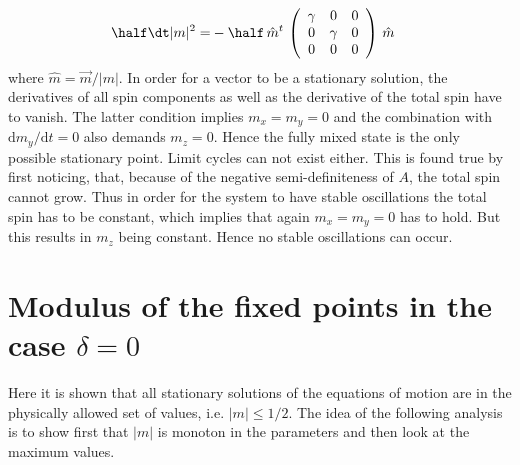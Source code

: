 \begin{appendices}
\begin{align*}
        \half\dt |m|^2=&-\half\,\hat{m}^t\,\left( \begin{array}{ccc}
            \gamma & 0&0  \\
            0& \gamma & 0\\
            0&0&0
       \end{array}\right)\,\hat{m}
    \end{align*}
    where $\hat{m}=\vec{m}/|m|$. In order for a vector to be a stationary solution, the derivatives of all spin components as well as the derivative of the total spin have to vanish. The latter condition implies $m_x=m_y=0$ and the combination with $\text{d}m_y/\text{d}t=0$ also demands $m_z=0$. Hence the fully mixed state is the only possible stationary point. Limit cycles can not exist either. This is found true by first noticing, that, because of the negative semi-definiteness of $A$, the total spin cannot grow. Thus in order for the system to have stable oscillations the total spin has to be constant, which implies that again $m_x=m_y=0$ has to hold. But this results in $m_z$ being constant. Hence no stable oscillations can occur.
    \newpage
    \section{Modulus of the fixed points in the case $\delta=0$}
    \label{appendix:mod_of_fixp}
    Here it is shown that all stationary solutions of the equations of motion are in the physically allowed set of values, i.e. $|m|\leq1/2$.
    The idea of the following analysis is to show first that $|m|$ is monoton in the parameters and then look at the maximum values.
    

\end{appendices}
